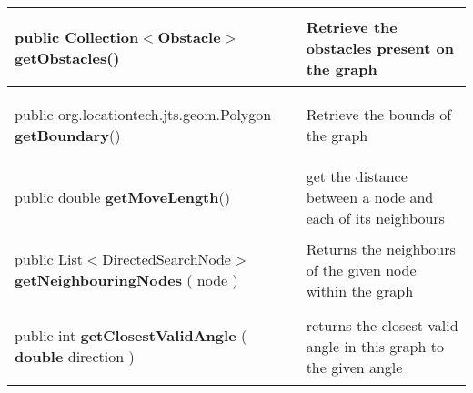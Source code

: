 {\begin{tabularx}{\linewidth}{X|m{}}
\begin{raggedleft}public Collection$<$Obstacle$>$ \textbf{getObstacles}()
\end{raggedleft} &
 Retrieve the obstacles present on the graph\\ \hline 
\begin{raggedleft}public org.locationtech.jts.geom.Polygon \textbf{getBoundary}()
\end{raggedleft} &
 Retrieve the bounds of the graph\\ \hline 
\begin{raggedleft}public double \textbf{getMoveLength}()
\end{raggedleft} &
 get the distance between a node and each of its neighbours\\ \hline 
\begin{raggedleft}public List$<$DirectedSearchNode$>$ \textbf{getNeighbouringNodes }(\hspace*{ 5pt} \textbf{\hyperref[tab:DirectedSearchNode]{\color{blue}{DirectedSearchNode}}} node  )
\end{raggedleft} &
 Returns the neighbours of the given node within the graph\\ \hline 
\begin{raggedleft}public int \textbf{getClosestValidAngle }(\hspace*{ 5pt} \textbf{double} direction  )
\end{raggedleft} &
 returns the closest valid angle in this graph to the given angle\\\end{tabularx}
}
